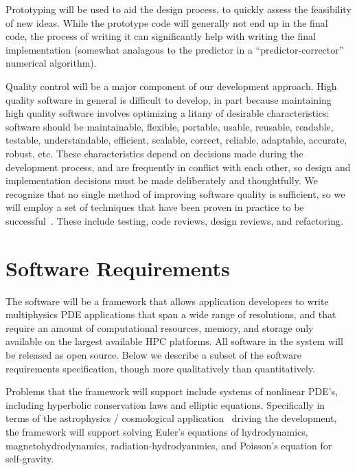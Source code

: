 \documentclass[10pt,twocolumn]{article}
\begin{document}
Prototyping will be used to aid the design process, to quickly assess
the feasibility of new ideas.  While the prototype code will generally
not end up in the final code, the process of writing it can
significantly help with writing the final implementation (somewhat
analagous to the predictor in a ``predictor-corrector'' numerical
algorithm).

Quality control will be a major component of our development approach.
High quality software in general is difficult to develop, in part
because maintaining high quality software involves optimizing a litany
of desirable characteristics: software should be maintainable,
flexible, portable, usable, reusable, readable, testable,
understandable, efficient, scalable, correct, reliable, adaptable,
accurate, robust, etc.  These characteristics depend on decisions made
during the development process, and are frequently in conflict with
each other, so design and implementation decisions must be made
deliberately and thoughtfully.  We recognize that no single method of
improving software quality is sufficient, so we will employ a set of
techniques that have been proven in practice to be
successful~\cite{Mc04}.  These include testing, code reviews, design
reviews, and refactoring.


\section{Software Requirements} \label{s:require}


The software will be a framework that allows application developers to
write multiphysics PDE applications that span a wide range of
resolutions, and that require an amount of computational resources,
memory, and storage only available on the largest available HPC
platforms.  All software in the system will be released as open
source.  Below we describe a subset of the software requirements
specification, though more qualitatively than quantitatively.

Problems that the framework will support include systems of nonlinear
PDE's, including hyperbolic conservation laws and elliptic equations.
Specifically in terms of the astrophysics / cosmological application
\enzoii\ driving the development, the framework will support solving
Euler's equations of hydrodynamics, magnetohydrodynamics,
radiation-hydrodyanmics, and Poisson's equation for self-gravity.
\end{document}
